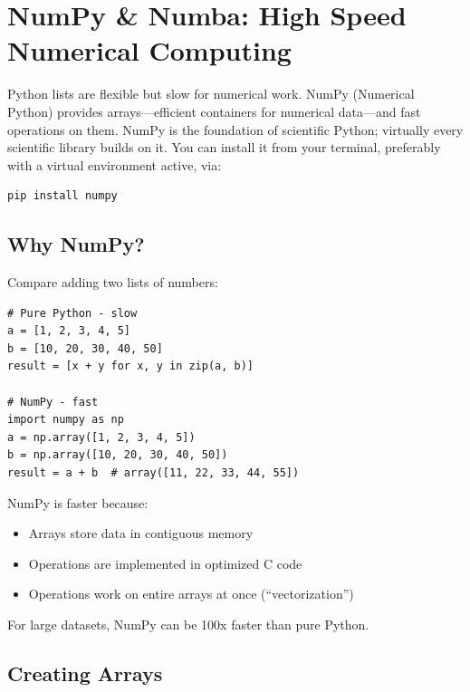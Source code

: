 
\chapter{NumPy \& Numba: High Speed Numerical Computing}
\label{chap:numpy}

Python lists are flexible but slow for numerical work. NumPy (Numerical Python) provides arrays---efficient containers for numerical data---and fast operations on them. NumPy is the foundation of scientific Python; virtually every scientific library builds on it. You can install it from your terminal, preferably with a virtual environment active, via:

\begin{lstlisting}
pip install numpy
\end{lstlisting}

\section{Why NumPy?}
\label{sec:why-numpy}

Compare adding two lists of numbers:

\begin{lstlisting}
# Pure Python - slow
a = [1, 2, 3, 4, 5]
b = [10, 20, 30, 40, 50]
result = [x + y for x, y in zip(a, b)]

# NumPy - fast
import numpy as np
a = np.array([1, 2, 3, 4, 5])
b = np.array([10, 20, 30, 40, 50])
result = a + b  # array([11, 22, 33, 44, 55])
\end{lstlisting}

NumPy is faster because:
\begin{itemize}
    \item Arrays store data in contiguous memory
    \item Operations are implemented in optimized C code
    \item Operations work on entire arrays at once (``vectorization'')
\end{itemize}

For large datasets, NumPy can be 100x faster than pure Python.

\section{Creating Arrays}
\label{sec:creating-arrays}

